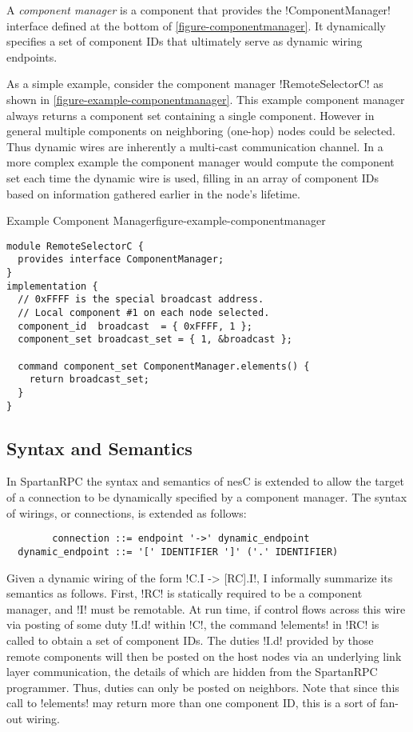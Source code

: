 A \emph{component manager} is a component that provides the !ComponentManager! interface defined
at the bottom of \autoref{figure-componentmanager}. It dynamically specifies a set of component
IDs that ultimately serve as dynamic wiring endpoints.

As a simple example, consider the component manager !RemoteSelectorC! as shown in
\autoref{figure-example-componentmanager}. This example component manager always returns a
component set containing a single component. However in general multiple components on
neighboring (one-hop) nodes could be selected. Thus dynamic wires are inherently a multi-cast
communication channel. In a more complex example the component manager would compute the
component set each time the dynamic wire is used, filling in an array of component IDs based on
information gathered earlier in the node's lifetime.

\begin{fpfig}[t]{Example Component Manager}{figure-example-componentmanager}
{
\singlespace
\begin{lstlisting}
module RemoteSelectorC {
  provides interface ComponentManager;
}
implementation {
  // 0xFFFF is the special broadcast address.
  // Local component #1 on each node selected.
  component_id  broadcast  = { 0xFFFF, 1 };
  component_set broadcast_set = { 1, &broadcast };

  command component_set ComponentManager.elements() {
    return broadcast_set;
  }
}
\end{lstlisting}
\primaryspacing
}
\end{fpfig}

\subsection{Syntax and Semantics}
\label{section-wiringsyntax}

In SpartanRPC the syntax and semantics of nesC is extended to allow the target of a connection
to be dynamically specified by a component manager. The syntax of wirings, or connections, is
extended as follows:

\singlespace
\begin{Verbatim}
        connection ::= endpoint '->' dynamic_endpoint
  dynamic_endpoint ::= '[' IDENTIFIER ']' ('.' IDENTIFIER)
\end{Verbatim}
\primaryspacing

Given a dynamic wiring of the form !C.I -> [RC].I!, I informally summarize its semantics as
follows. First, !RC! is statically required to be a component manager, and !I! must be
remotable. At run time, if control flows across this wire via posting of some duty !I.d! within
!C!, the command !elements! in !RC! is called to obtain a set of component IDs. The duties !I.d!
provided by those remote components will then be posted on the host nodes via an underlying link
layer communication, the details of which are hidden from the SpartanRPC programmer. Thus,
duties can only be posted on neighbors. Note that since this call to !elements! may return more
than one component ID, this is a sort of fan-out wiring.

